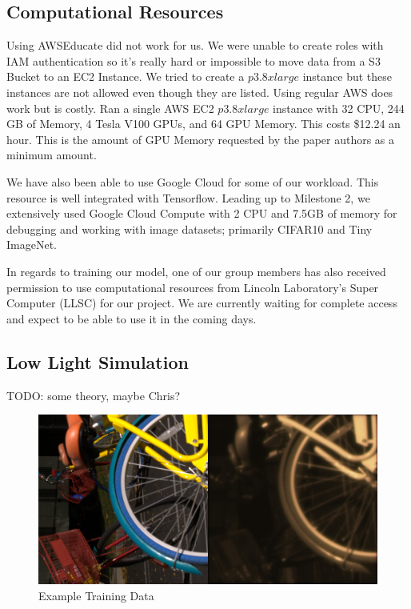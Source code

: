 \documentclass{article}
\begin{document}
\subsection{Computational Resources}

Using AWSEducate did not work for us. We were unable to create roles with
IAM authentication so it's really hard or impossible to move data from a
S3 Bucket to an EC2 Instance. We tried to create a $p3.8xlarge$ instance but
these instances are not allowed even though they are listed. Using regular
AWS does work but is costly. Ran a single AWS EC2 $p3.8xlarge$ instance
with 32 CPU, 244 GB of Memory, 4 Tesla V100 GPUs, and 64 GPU Memory. This
costs \$12.24 an hour. This is the amount of GPU Memory requested by the
paper authors as a minimum amount. \newline

We have also been able to use Google Cloud for some of our workload. This
resource is well integrated with Tensorflow. Leading up to Milestone 2,
we extensively used Google Cloud Compute with 2 CPU and 7.5GB of memory
for debugging and working with image datasets; primarily CIFAR10 and
Tiny ImageNet. \newline

In regards to training our model, one of our group members has also
received permission to use computational resources from Lincoln
Laboratory's Super Computer (LLSC) for our project. We are currently
waiting for complete access and expect to be able to use it in the coming
days.

\subsection{Low Light Simulation}

TODO: some theory, maybe Chris?

\begin{figure}[ht]
  \centering
  \includegraphics[scale=0.1]{00002_00_train_100}
  \caption{ Example Training Data}
  \label{fig:train}
\end{figure}
\end{document}
